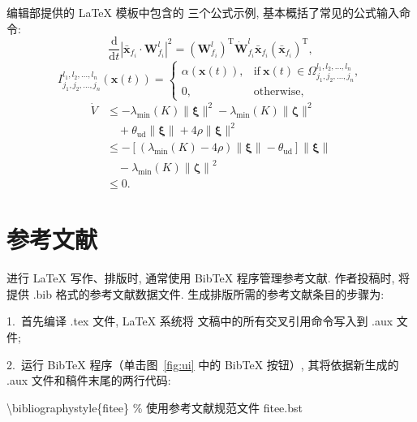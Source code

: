 \documentclass[twoside,twocolumn]{article}
\begin{document}
\begin{CJK}{UTF8}{song}
编辑部提供的 \LaTeX{} 模板中包含的
三个公式示例, 基本概括了常见的公式输入命令: 
\begin{equation}
\frac{\mathrm{d}}{\mathrm{d}t} {| \bar{\bm{x}}_{f_i} \cdot {\bm{W}}_{f_i}^l |^2 }= ({{\bm{W}}_{f_i}^l})^\mathrm{T} \dot {\bm{W}}_{f_i}^l \bar {\bm{x}}_{f_i} ({\bar {\bm{x}}_{f_i}})^\mathrm{T},
\end{equation}
\begin{equation}\label{indicatorfunc}
I_{j_1, j_2, \ldots, j_n}^{l_1, l_2, \ldots, l_n} (\bm{x}(t))=
	\begin{cases}
		\alpha(\bm{x}(t)), & \mathrm{if}\ \bm{x}(t) \in \Omega_{j_1, j_2, \ldots, j_n}^{l_1, l_2, \ldots, l_n}, \\
		0,                 & \mathrm{otherwise},
	\end{cases}
\end{equation}
\begin{equation}\label{eqn:Lyapdisturb1}
\begin{aligned}
	\dot{V} & \leq  - \lambda_{\min} ( K ) \| \bm{\xi} \|^2 - \lambda_{\min} ( K ) \| \bm{\zeta} \|^2                       \\
	        & \quad + \theta_\mathrm{ud} \| \bm{\xi} \| + 4 \rho \| \bm{\xi} \|^2                                           \\
	        & \leq  - \left[ ( \lambda_{\min} ( K )- 4 \rho ) \| \bm{\xi} \|  -  \theta_\mathrm{ud}  \right] \| \bm{\xi} \| \\
	        & \quad -\lambda_{\min} ( K ) \left\| \bm{\zeta} \right\|^2                                                     \\
	        & \leq 0.
\end{aligned}
\end{equation}

\section{参考文献}

进行 \LaTeX{} 写作、排版时, 通常使用 BibTeX 程序管理参考文献. 
作者投稿时, 将提供 .bib 格式的参考文献数据文件. 
生成排版所需的参考文献条目的步骤为: 

1.~首先编译 .tex 文件, \LaTeX{} 系统将
文稿中的所有交叉引用命令写入到 .aux 文件; 

2.~运行 BibTeX 程序（单击图~\ref{fig:ui} 中的 BibTeX 按钮）, 其将依据新生成的 .aux 文件和稿件末尾的两行代码: 

\textbackslash bibliographystyle\{fitee\} \% 使用参考文献规范文件 fitee.bst


\end{CJK}
\end{document}
